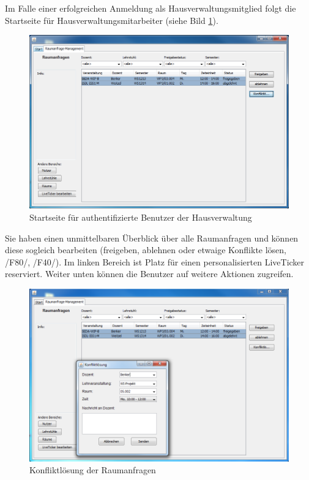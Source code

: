 Im Falle einer erfolgreichen Anmeldung als Hausverwaltungsmitglied folgt die Startseite für Hausverwaltungsmitarbeiter (siehe Bild \ref{img:hauptseiteVerwaltung}). 
\begin{figure}[H]
\begin{center}
\includegraphics[width=150mm]{images/section_7/VerwaltungHauptseite.PNG}
\caption{Startseite für authentifizierte Benutzer der Hausverwaltung}
\label{img:hauptseiteVerwaltung}
\end{center}
\end{figure}
Sie haben einen unmittelbaren Überblick über alle Raumanfragen und können diese sogleich bearbeiten (freigeben, ablehnen oder etwaige Konflikte lösen, /F80/, /F40/).
Im linken Bereich ist Platz für einen personalisierten LiveTicker reserviert. Weiter unten können die Benutzer auf weitere Aktionen zugreifen.
\begin{figure}[H]
\begin{center}
\includegraphics[width=150mm]{images/section_7/VerwaltungRaumanfragen.PNG}
\caption{Konfliktlösung der Raumanfragen}
\label{img:KonfliktlösungVerwaltung}
\end{center}
\end{figure}
